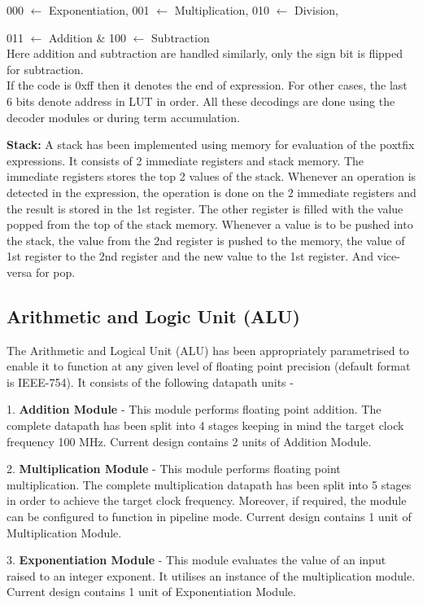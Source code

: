 000 $\leftarrow$ Exponentiation, 001 $\leftarrow$ Multiplication, 010 $\leftarrow$ Division,

011 $\leftarrow$ Addition \& 100 $\leftarrow$ Subtraction\\
Here addition and subtraction are handled similarly, only the sign bit is flipped for subtraction.\\
If the code is 0xff then it denotes the end of expression. For other cases, the last 6 bits denote address in LUT in order. All these decodings are done using the decoder modules or during term accumulation. 

\textbf{Stack:} A stack has been implemented using memory for evaluation of the poxtfix expressions. It consists of 2 immediate registers and stack memory. The immediate registers stores the top 2 values of the stack. Whenever an operation is detected in the expression, the operation is done on the 2 immediate registers and the result is stored in the 1st register. The other register is filled with the value popped from the top of the stack memory. Whenever a value is to be pushed into the stack, the value from the 2nd register is pushed to the memory, the value of 1st register to the 2nd register and the new value to the 1st register. And vice-versa for pop. 

\subsection{Arithmetic and Logic Unit (ALU)}
The Arithmetic and Logical Unit (ALU) has been appropriately parametrised to enable it to function at any given level of floating point precision (default format is IEEE-754). It consists of the following datapath units -

1. {\bf Addition Module} - This module performs floating point addition. The complete datapath has been split into 4 stages keeping in mind the target clock frequency 100 MHz. Current design contains 2 units of Addition Module.

2. {\bf Multiplication Module} - This module performs floating point multiplication. The complete multiplication datapath has been split into 5 stages in order to achieve the target clock frequency. Moreover, if required, the module can be configured to function in pipeline mode. Current design contains 1 unit of Multiplication Module.

3. {\bf Exponentiation Module} - This module evaluates the value of an input raised to an integer exponent. It utilises an instance of the multiplication module. Current design contains 1 unit of Exponentiation Module.

